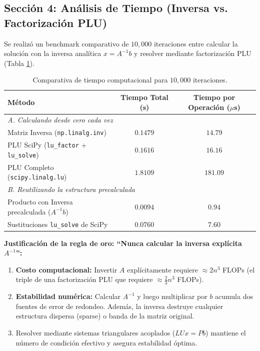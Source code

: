 \documentclass[11pt,a4paper]{article}
\theoremstyle{definition}
\theoremstyle{remark}
\begin{document}
\subsection{Sección 4: Análisis de Tiempo (Inversa vs. Factorización PLU)}
Se realizó un benchmark comparativo de $10{,}000$ iteraciones entre calcular la solución con la inversa analítica $x = A^{-1}b$ y resolver mediante factorización PLU (Tabla \ref{tab:benchmark_tiempo}).

\begin{table}[h!]
    \centering
    \small
    \caption{Comparativa de tiempo computacional para $10{,}000$ iteraciones.}
    \label{tab:benchmark_tiempo}
    \begin{tabular}{lcc}
        \toprule
        \textbf{Método} & \textbf{Tiempo Total (s)} & \textbf{Tiempo por Operación ($\mu$s)} \\
        \midrule
        \multicolumn{3}{l}{\textit{A. Calculando desde cero cada vez}} \\
        Matriz Inversa (\texttt{np.linalg.inv}) & $0.1479$ & $14.79$ \\
        PLU SciPy (\texttt{lu\_factor} + \texttt{lu\_solve}) & $0.1616$ & $16.16$ \\
        PLU Completo (\texttt{scipy.linalg.lu}) & $1.8109$ & $181.09$ \\
        \midrule
        \multicolumn{3}{l}{\textit{B. Reutilizando la estructura precalculada}} \\
        Producto con Inversa precalculada ($A^{-1}b$) & $0.0094$ & $0.94$ \\
        Sustituciones \texttt{lu\_solve} de SciPy & $0.0760$ & $7.60$ \\
        \bottomrule
    \end{tabular}
\end{table}

\textbf{Justificación de la regla de oro: ``Nunca calcular la inversa explícita $A^{-1}$'':}
\begin{enumerate}
    \item \textbf{Costo computacional:} Invertir $A$ explícitamente requiere $\approx 2n^3$ FLOPs (el triple de una factorización PLU que requiere $\approx \frac{2}{3}n^3$ FLOPs).
    \item \textbf{Estabilidad numérica:} Calcular $A^{-1}$ y luego multiplicar por $b$ acumula dos fuentes de error de redondeo. Además, la inversa destruye cualquier estructura dispersa (sparse) o banda de la matriz original.
    \item Resolver mediante sistemas triangulares acoplados ($LUx = Pb$) mantiene el número de condición efectivo y asegura estabilidad óptima.
\end{enumerate}
\end{document}
